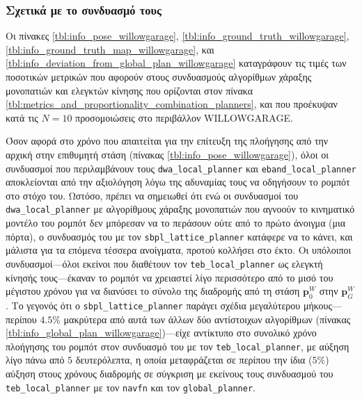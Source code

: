 \subsubsection{Σχετικά με το συνδυασμό τους}

Οι πίνακες \ref{tbl:info_pose_willowgarage},
\ref{tbl:info_ground_truth_willowgarage},
\ref{tbl:info_ground_truth_map_willowgarage}, και
\ref{tbl:info_deviation_from_global_plan_willowgarage} καταγράφουν τις τιμές
των ποσοτικών μετρικών που αφορούν στους συνδυασμούς αλγορίθμων χάραξης
μονοπατιών και ελεγκτών κίνησης που ορίζονται στον πίνακα
\ref{tbl:metrics_and_proportionality_combination_planners}, και που προέκυψαν
κατά τις $N = 10$ προσομοιώσεις στο περιβάλλον WILLOWGARAGE.

Όσον αφορά στο χρόνο που απαιτείται για την επίτευξη της πλοήγησης από την
αρχική στην επιθυμητή στάση (πίνακας \ref{tbl:info_pose_willowgarage}), όλοι οι
συνδυασμοί που περιλαμβάνουν τους \texttt{dwa\_local\_planner} και
\texttt{eband\_local\_planner} αποκλείονται από την αξιολόγηση λόγω της
αδυναμίας τους να οδηγήσουν το ρομπότ στο στόχο του. Ωστόσο, πρέπει να
σημειωθεί ότι ενώ οι συνδυασμοί του \texttt{dwa\_local\_planner} με αλγορίθμους
χάραξης μονοπατιών που αγνοούν το κινηματικό μοντέλο του ρομπότ δεν μπόρεσαν να
το περάσουν ούτε από το πρώτο άνοιγμα (μια πόρτα), ο συνδυασμός του με τον
\texttt{sbpl\_lattice\_planner} κατάφερε να το κάνει, και μάλιστα για τα
επόμενα τέσσερα ανοίγματα, προτού κολλήσει στο έκτο. Οι υπόλοιποι
συνδυασμοί---όλοι εκείνοι που διαθέτουν τον \texttt{teb\_local\_planner} ως
ελεγκτή κίνησής τους---έκαναν το ρομπότ να χρειαστεί λίγο περισσότερο από το
μισό του μέγιστου χρόνου για να διανύσει το σύνολο της διαδρομής από τη
στάση $\bm{p}_0^W$ στην $\bm{p}_G^W$. Το γεγονός ότι ο
\texttt{sbpl\_lattice\_planner} παράγει σχέδια μεγαλύτερου μήκους---περίπου
$4.5\%$ μακρύτερα από αυτά των άλλων δύο αντίστοιχων αλγορίθμων (πίνακας
\ref{tbl:info_global_plan_willowgarage})---είχε αντίκτυπο στο συνολικό χρόνο
πλοήγησης του ρομπότ στον συνδυασμό του με τον \texttt{teb\_local\_planner}, με
αύξηση λίγο πάνω από $5$ δευτερόλεπτα, η οποία μεταφράζεται σε περίπου την
ίδια ($5\%$) αύξηση στους χρόνους διαδρομής σε σύγκριση με εκείνους τους
συνδυασμού του \texttt{teb\_local\_planner} με τον \texttt{navfn} και τον
\texttt{global\_planner}.

